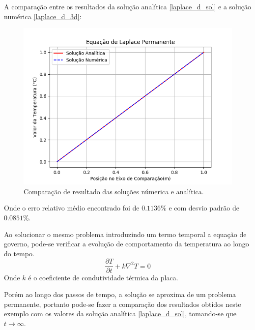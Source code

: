 A comparação entre os resultados da solução analítica \ref{laplace_d_sol} e a solução numérica \ref{laplace_d_3d}:
\begin{figure}[H]
    \centering
    \includegraphics[width=.7\linewidth]{figures/laplace_dirichlet_permanent_comparison.png}
    \caption{Comparação de resultado das soluções númerica e analítica.}
    \label{laplace_d_perm_comp}
\end{figure}
Onde o erro relativo médio encontrado foi de $0.1136\%$ e com desvio padrão de $0.0851\%$.

Ao solucionar o mesmo problema introduzindo um termo temporal a equação de governo, pode-se verificar a evolução de comportamento da temperatura ao longo do tempo.
\begin{equation}
    \dfrac{\partial T}{\partial t} + k\nabla^2 T = 0
    \label{laplace_d_trans_eq} 
\end{equation}
Onde $k$ é o coeficiente de condutividade térmica da placa.

Porém ao longo dos passos de tempo, a solução se aproxima de um problema permanente, portanto pode-se fazer a comparação dos resultados obtidos neste exemplo com os valores da solução analítica \ref{laplace_d_sol}, tomando-se que $t\rightarrow \infty$.

